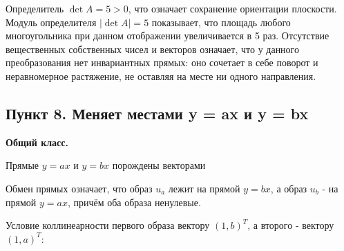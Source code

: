 \documentclass[a4paper,14pt]{extarticle}
\begin{document}
Определитель \(\det A = 5 > 0\), что означает сохранение ориентации
плоскости. Модуль определителя \(|\det A| = 5\) показывает, что площадь
любого многоугольника при данном отображении увеличивается в 5 раз.
Отсутствие вещественных собственных чисел и векторов означает, что у
данного преобразования нет инвариантных прямых: оно сочетает в себе
поворот и неравномерное растяжение, не оставляя на месте ни одного
направления.

\hypertarget{ux43fux443ux43dux43aux442-8.-ux43cux435ux43dux44fux435ux442-ux43cux435ux441ux442ux430ux43cux438-y-ax-ux438-y-bx}{%
\subsection{Пункт 8. Меняет местами y = ax и y =
bx}\label{ux43fux443ux43dux43aux442-8.-ux43cux435ux43dux44fux435ux442-ux43cux435ux441ux442ux430ux43cux438-y-ax-ux438-y-bx}}

\textbf{Общий класс.}

Прямые \(y = ax\) и \(y = bx\) порождены векторами \begin{center}\end{center}

Обмен прямых означает, что образ \(u_a\) лежит на прямой \(y = bx\), а
образ \(u_b\) - на прямой \(y = ax\), причём оба образа ненулевые. \begin{center}\end{center}

Условие коллинеарности первого образа вектору \((1, b)^T\), а второго -
вектору \((1, a)^T\): \begin{center}\end{center}
\end{document}

